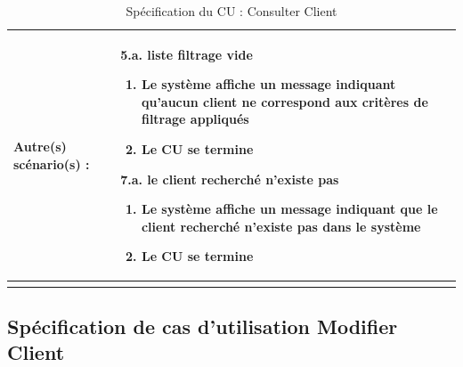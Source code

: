 \begin{longtable}{|>{\bfseries\raggedright\arraybackslash}p{3.5cm}|p{\dimexpr\textwidth-3.5cm-4\tabcolsep-2\arrayrulewidth}|}
\hline
Autre(s) scénario(s) : &
\textbf{5.a. liste filtrage vide}
\begin{enumerate}[leftmargin=1.5em, topsep=2pt, itemsep=1pt]
  \item Le système affiche un message indiquant qu'aucun client ne correspond aux critères de filtrage appliqués
  \item Le CU se termine
\end{enumerate}
\textbf{7.a. le client recherché n'existe pas}
\begin{enumerate}[leftmargin=1.5em, topsep=2pt, itemsep=1pt]
  \item Le système affiche un message indiquant que le client recherché n'existe pas dans le système
  \item Le CU se termine
\end{enumerate} \\
\hline
\caption{Spécification du CU : Consulter Client}
\label{tab:cu-consulter-client}
\end{longtable}

\subsection{Spécification de cas d'utilisation Modifier Client}

